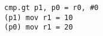 \begin{lstlisting}[caption=Predicated MOV in Itanium,frame=tlrb,label={lst:itanium_predicated}]
cmp.gt p1, p0 = r0, #0
(p1) mov r1 = 10
(p0) mov r1 = 20
\end{lstlisting}